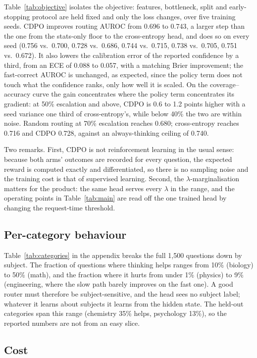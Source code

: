\documentclass{article}
\newcommand{\cdpo}{CDPO}
\begin{document}
Table~\ref{tab:objective} isolates the objective: features, bottleneck, split and early-stopping protocol are held fixed and only the loss changes, over five training seeds. \cdpo{} improves routing AUROC from 0.696 to 0.743, a larger step than the one from the stats-only floor to the cross-entropy head, and does so on every seed (0.756 vs.\ 0.700, 0.728 vs.\ 0.686, 0.744 vs.\ 0.715, 0.738 vs.\ 0.705, 0.751 vs.\ 0.672). It also lowers the calibration error of the reported confidence by a third, from an ECE of 0.088 to 0.057, with a matching Brier improvement; the fast-correct AUROC is unchanged, as expected, since the policy term does not touch what the confidence ranks, only how well it is scaled. On the coverage--accuracy curve the gain concentrates where the policy term concentrates its gradient: at 50\% escalation and above, \cdpo{} is 0.6 to 1.2 points higher with a seed variance one third of cross-entropy's, while below 40\% the two are within noise. Random routing at 70\% escalation reaches 0.680; cross-entropy reaches 0.716 and \cdpo{} 0.728, against an always-thinking ceiling of 0.740.

Two remarks. First, \cdpo{} is not reinforcement learning in the usual sense: because both arms' outcomes are recorded for every question, the expected reward is computed exactly and differentiated, so there is no sampling noise and the training cost is that of supervised learning. Second, the $\lambda$-marginalisation matters for the product: the same head serves every $\lambda$ in the range, and the operating points in Table~\ref{tab:main} are read off the one trained head by changing the request-time threshold.

\subsection{Per-category behaviour}

Table~\ref{tab:categories} in the appendix breaks the full 1{,}500 questions down by subject. The fraction of questions where thinking helps ranges from 10\% (biology) to 50\% (math), and the fraction where it hurts from under 1\% (physics) to 9\% (engineering, where the slow path barely improves on the fast one). A good router must therefore be subject-sensitive, and the head sees no subject label; whatever it learns about subjects it learns from the hidden state. The held-out categories span this range (chemistry 35\% helps, psychology 13\%), so the reported numbers are not from an easy slice.

\subsection{Cost}
\end{document}
